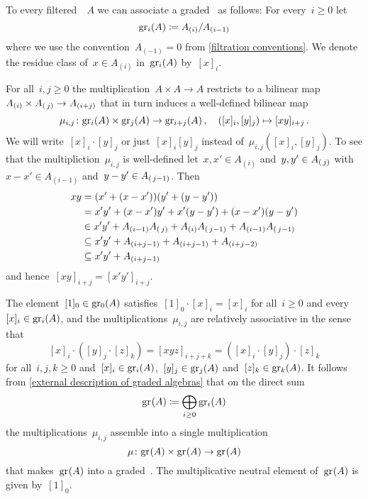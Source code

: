 \begin{construction}
  \label{construction of associated graded}
  To every filtered~{\algebra{$\kf$}}~$A$ we can associate a graded~{\algebra{$\kf$}} as follows:
  For every~$i \geq 0$ let
  \[
    \gr[i](A)
    \defined
    A_{(i)} / A_{(i-1)}
  \]
  where we use the convention~$A_{(-1)} = 0$ from \cref{filtration conventions}.
  We denote the residue class of~$x \in A_{(i)}$ in~$\gr[i](A)$ by~$[x]_i$.
  
  For all~$i, j \geq 0$ the multiplication~$A \times A \to A$ restricts to a bilinear map~$A_{(i)} \times A_{(\, j)} \to A_{(i+j)}$ that in turn induces a well-defined bilinear map
  \[
    \mu_{i,j}
    \colon
    \gr[i](A) \times \gr[j](A)
    \to
    \gr[i+j](A) \,,
    \quad
    ([x]_i, [y]_j)
    \mapsto
    [xy]_{i+j}  \,.
  \]
  We will write~$[x]_i \cdot [y]_j$ or just~$[x]_i [y]_j$ instead of~$\mu_{i,j}([x]_i, [y]_j)$.
  To see that the multipliction~$\mu_{i,j}$ is well-defined let~$x, x' \in A_{(i)}$ and~$y, y' \in A_{(\, j)}$ with~$x - x ' \in A_{(i-1)}$ and~$y - y' \in A_{(\, j-1)}$.
  Then
  \begin{align*}
    x y
    &=
    (x' + (x - x')) (y' + (y - y'))
    \\
    &=
    x' y' + (x - x') y' + x' (y - y') + (x - x')(y - y')
    \\
    &\in
    x' y' + A_{(i-1)} A_{(\, j)} + A_{(i)} A_{(\, j-1)} + A_{(i-1)} A_{(\, j-1)}
    \\
    &\subseteq
    x' y' + A_{(i+j-1)} + A_{(i+j-1)} + A_{(i+j-2)}
    \\
    &\subseteq
    x' y' + A_{(i+j-1)}
  \end{align*}
  and hence~$[xy]_{i+j} = [x'y']_{i+j}$.
  
  The element~$[1]_0 \in \gr[0](A)$ satisfies~$[1]_0 \cdot [x]_i = [x]_i$ for all~$i \geq 0$ and every~$[x]_i \in \gr[i](A)$, and the multiplications~$\mu_{i,j}$ are relatively associative in the sense that
  \[
    [x]_i \cdot ([y]_j \cdot [z]_k)
    =
    [xyz]_{i+j+k}
    =
    ([x]_i \cdot [y]_j) \cdot [z]_k
  \]
  for all~$i, j, k \geq 0$ and~$[x]_i \in \gr[i](A)$,~$[y]_j \in \gr[j](A)$ and~$[z]_k \in \gr[k](A)$.
  It follows from \cref{external description of graded algebras} that on the direct sum
  \[
    \gr(A)
    \defined
    \bigoplus_{i \geq 0} \gr[i](A)
  \]
  the multiplications~$\mu_{i,j}$ assemble into a single multiplication
  \[
    \mu
    \colon
    \gr(A) \times \gr(A)
    \to
    \gr(A)
  \]
  that makes~$\gr(A)$ into a graded~{\algebra{$\kf$}}.
  The multiplicative neutral element of~$\gr(A)$ is given by~$[1]_0$.
\end{construction}


